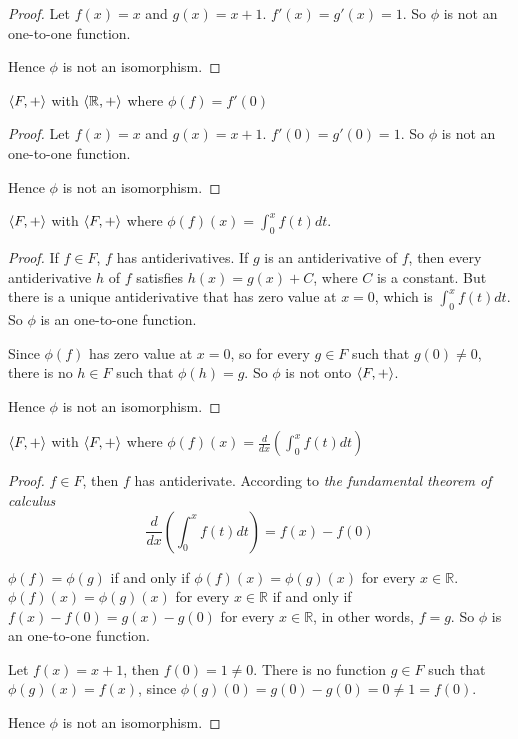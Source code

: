 \begin{proof}
    Let $f(x) = x$ and $g(x) = x + 1$. $f'(x) = g'(x) = 1$. So $\phi$ is not an one-to-one function.

    Hence $\phi$ is not an isomorphism.
\end{proof}

\begin{exercise}
    $\left\langle{F, +}\right\rangle$ with $\left\langle{\mathbb{R}, +}\right\rangle$ where $\phi(f) = f'(0)$
\end{exercise}

\begin{proof}
    Let $f(x) = x$ and $g(x) = x + 1$. $f'(0) = g'(0) = 1$. So $\phi$ is not an one-to-one function.

    Hence $\phi$ is not an isomorphism.
\end{proof}

\begin{exercise}
    $\left\langle{F,+}\right\rangle$ with $\left\langle{F,+}\right\rangle$ where $\phi(f)(x) = \int^{x}_{0}f(t)dt$.
\end{exercise}

\begin{proof}
    If $f\in F$, $f$ has antiderivatives. If $g$ is an antiderivative of $f$, then every antiderivative $h$ of $f$ satisfies $h(x) = g(x) + C$, where $C$ is a constant. But there is a unique antiderivative that has zero value at $x = 0$, which is $\int^{x}_{0}f(t)dt$. So $\phi$ is an one-to-one function.

    Since $\phi(f)$ has zero value at $x = 0$, so for every $g\in F$ such that $g(0)\ne 0$, there is no $h\in F$ such that $\phi(h) = g$. So $\phi$ is not onto $\left\langle{F,+}\right\rangle$.

    Hence $\phi$ is not an isomorphism.
\end{proof}

\begin{exercise}
    $\left\langle{F,+}\right\rangle$ with $\left\langle{F,+}\right\rangle$ where $\phi(f)(x) = \frac{d}{dx}\left(\int^{x}_{0} f(t)dt\right)$
\end{exercise}

\begin{proof}
    $f\in F$, then $f$ has antiderivate. According to \textit{the fundamental theorem of calculus}
    \[
        \frac{d}{dx}\left(\int^{x}_{0}f(t)dt\right) = f(x) - f(0)
    \]

    $\phi(f) = \phi(g)$ if and only if $\phi(f)(x) = \phi(g)(x)$ for every $x\in\mathbb{R}$. $\phi(f)(x) = \phi(g)(x)$ for every $x\in\mathbb{R}$ if and only if $f(x) - f(0) = g(x) - g(0)$ for every $x\in\mathbb{R}$, in other words, $f = g$. So $\phi$ is an one-to-one function.

    Let $f(x) = x + 1$, then $f(0) = 1\ne 0$. There is no function $g\in F$ such that $\phi(g)(x) = f(x)$, since $\phi(g)(0) = g(0) - g(0) = 0 \ne 1 = f(0)$.

    Hence $\phi$ is not an isomorphism.
\end{proof}

